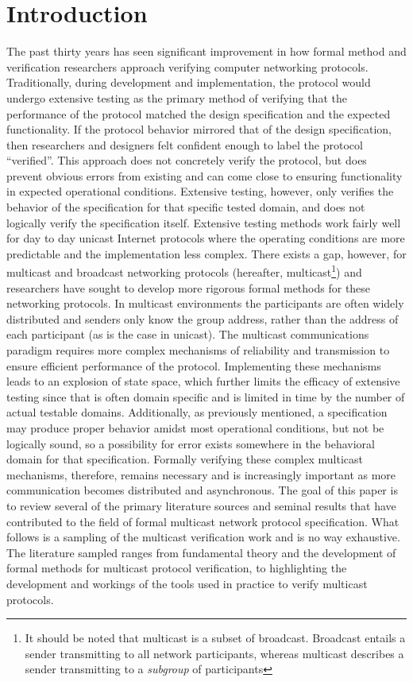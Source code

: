 \documentclass[12pt, fullpage]{article}
\begin{document}
\section{Introduction}
The past thirty years has seen significant improvement in how formal method and verification researchers approach verifying computer networking protocols. Traditionally, during development and implementation, the protocol would undergo extensive testing as the primary method of verifying that the performance of the protocol matched the design specification and the expected functionality. If the protocol behavior mirrored that of the design specification, then researchers and designers felt confident enough to label the protocol ``verified''. This approach does not concretely verify the protocol, but does prevent obvious errors from existing and can come close to ensuring functionality in expected operational conditions. Extensive testing, however, only verifies the behavior of the specification for that specific tested domain, and does not logically verify the specification itself.
\bigbreak
Extensive testing methods work fairly well for day to day unicast Internet protocols where the operating conditions are more predictable and the implementation less complex. There exists a gap, however, for multicast and broadcast networking protocols (hereafter, multicast\footnote{It should be noted that multicast is a subset of broadcast. Broadcast entails a sender transmitting to all network participants, whereas multicast describes a sender transmitting to a \textit{subgroup} of participants}) and researchers have sought to develop more rigorous formal methods for these networking protocols. In multicast environments the participants are often widely distributed and senders only know the group address, rather than the address of each participant (as is the case in unicast). The multicast communications paradigm requires more complex mechanisms of reliability and transmission to ensure efficient performance of the protocol. Implementing these mechanisms leads to an explosion of state space, which further limits the efficacy of extensive testing since that is often domain specific and is limited in time by the number of actual testable domains. Additionally, as previously mentioned, a specification may produce proper behavior amidst most operational conditions, but not be logically sound, so a possibility for error exists somewhere in the behavioral domain for that specification. Formally verifying these complex multicast mechanisms, therefore, remains necessary and is increasingly important as more communication becomes distributed and asynchronous.
\bigbreak
The goal of this paper is to review several of the primary literature sources and seminal results that have contributed to the field of formal multicast network protocol specification. What follows is a sampling of the multicast verification work and is no way exhaustive. The literature sampled ranges from fundamental theory and the development of formal methods for multicast protocol verification, to highlighting the development and workings of the tools used in practice to verify multicast protocols.
\end{document}
